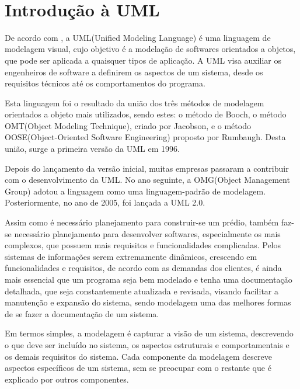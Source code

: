 \documentclass[12pt,openright,oneside,a4paper,
	chapter=TITLE,
	section=TITLE,
	english,brazil]{abntex2}
\author{Heber Ferreira Barra \\ João Gabriel de Cristo}
\date{2024}
\renewcommand{\ABNTEXchapterfont}{\bfseries\MakeUppercase\sffamily}
\renewcommand{\imprimircapa}{%
	\begin{capa}
		\center
		\ABNTEXchapterfont\bfseries\MakeUppercase\imprimirinstituicao\\
		\vspace*{1cm}
		\ABNTEXchapterfont\bfseries\MakeUppercase\imprimirautor
		\vfill
		\begin{center}
			\ABNTEXchapterfont\bfseries\MakeUppercase\imprimirtitulo
		\end{center}
		\vfill

		\bfseries\MakeUppercase\imprimirlocal

		\bfseries\MakeUppercase\imprimirdata

		\vspace*{1cm}
	\end{capa}
}
\begin{document}
\imprimircapa
\imprimirfolhaderosto

\listoffigures*
\cleardoublepage

\tableofcontents*
\cleardoublepage

\textual
\chapter{Introdução à UML}
De acordo com \cite{GUEDES}, a UML(Unified Modeling Language) é uma linguagem de modelagem visual, cujo objetivo é a modelação de softwares orientados a objetos, que pode ser aplicada a quaisquer tipos de aplicação. A UML visa auxiliar os engenheiros de software a definirem os aspectos de um sistema, desde os requisitos técnicos até os comportamentos do programa.

Esta linguagem foi o resultado da união dos três métodos de modelagem orientados a objeto mais utilizados, sendo estes: o método de Booch, o método OMT(Object Modeling Technique), criado por Jacobson, e o método OOSE(Object-Oriented Software Engineering) proposto por Rumbaugh. Desta união, surge a primeira versão da UML em 1996. 

Depois do lançamento da versão inicial, muitas empresas passaram a contribuir com o desenvolvimento da UML. No ano seguinte, a OMG(Object Management Group) adotou a linguagem como uma linguagem-padrão de modelagem. Posteriormente, no ano de 2005, foi lançada a UML 2.0.

Assim como é necessário planejamento para construir-se um prédio, também faz-se necessário planejamento para desenvolver softwares, especialmente os mais complexos, que possuem mais requisitos e funcionalidades complicadas. Pelos sistemas de informações serem extremamente dinâmicos, crescendo em funcionalidades e requisitos, de acordo com as demandas dos clientes, é ainda mais essencial que um programa seja bem modelado e tenha uma documentação detalhada, que seja constantemente atualizada e revisada, visando facilitar  a manutenção e expansão do sistema, sendo modelagem uma das melhores formas de se fazer a documentação de um sistema.

Em termos simples, a modelagem é capturar a visão de um sistema, descrevendo o que deve ser incluído no sistema, os aspectos estruturais e comportamentais e os demais requisitos do sistema. Cada componente da modelagem descreve aspectos específicos de um sistema, sem se preocupar com o restante que é explicado por outros componentes.
\end{document}
